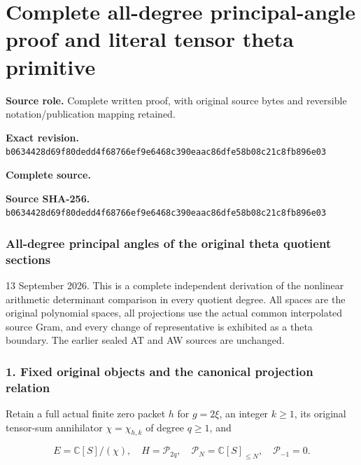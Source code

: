 \begingroup

\section{Complete all-degree principal-angle proof and literal tensor theta primitive}


\begingroup
\sloppy
\small

\noindent\textbf{Source role.} Complete written proof, with original source bytes and reversible notation/publication mapping retained.\par
\noindent\textbf{Exact revision.} \nolinkurl{b0634428d69f80dedd4f68766ef9e6468c390eaac86dfe58b08c21c8fb896e03}\par
\noindent\textbf{Complete source.} \par
\noindent\textbf{Source SHA-256.} \nolinkurl{b0634428d69f80dedd4f68766ef9e6468c390eaac86dfe58b08c21c8fb896e03}\par\medskip
\subsubsection{All-degree principal angles of the original theta quotient sections}\label{endpoint-all_degree_angle_review--all-degree-principal-angles-of-the-original-theta-quotient-sections}

13 September 2026. This is a complete independent derivation of the nonlinear arithmetic determinant comparison in every quotient degree. All spaces are the original polynomial spaces, all projections use the actual common interpolated source Gram, and every change of representative is exhibited as a theta boundary. The earlier sealed AT and AW sources are unchanged.

\subsubsection{1. Fixed original objects and the canonical projection relation}\label{endpoint-all_degree_angle_review--fixed-original-objects-and-the-canonical-projection-relation}

Retain a full actual finite zero packet \(h\) for \(g=2\xi\), an integer \(k\ge1\), its original tensor-sum annihilator \(\chi=\chi_{h,k}\) of degree \(q\ge1\), and

\[
E=\mathbb C[S]/(\chi),\quad H=\mathcal P_{2q},\quad
\mathcal P_N=\mathbb C[S]_{\le N},\quad\mathcal P_{-1}=0.
\tag{AA1}
\]

